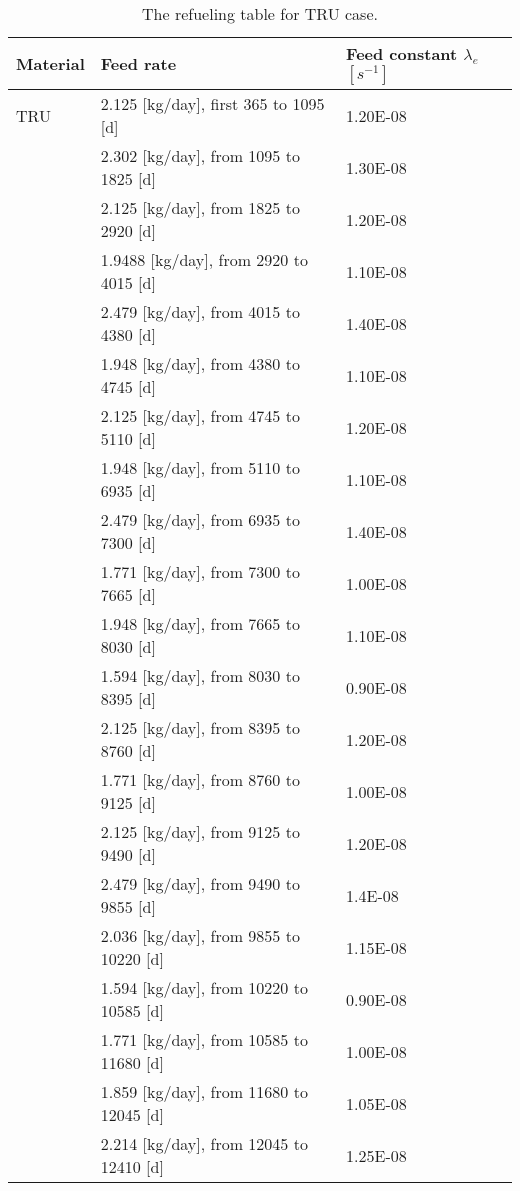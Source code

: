 \newpage
\begin{longtable}{|p{}|p{}|p{}|}
	\caption{The refueling table for TRU case.} 
	\vspace{-0.2in}
	\label{tab:table10}
	\endfirsthead
	\endhead
	\hline
	\textbf{Material} & \textbf{Feed rate} & \textbf{Feed 
		constant} $\lambda_{e}$ $[s^{-1}]$ \\
	\hline
	TRU        &  2.125 [kg/day], first 365 to 1095  [d] & 1.20E-08 \\
	&  2.302  [kg/day], from 1095 to 1825 [d] & 		1.30E-08 \\
	&  2.125  [kg/day], from 1825 to 2920 [d] & 		1.20E-08 \\
	&  1.9488 [kg/day], from 2920 to 4015 [d]& 		1.10E-08	\\
	&  2.479 [kg/day], from 4015 to 4380 [d] &		1.40E-08	\\
	&  1.948 [kg/day], from 4380 to 4745 [d] &		1.10E-08	\\
	&  2.125   [kg/day], from 4745 to 5110 [d] &	1.20E-08	\\
	&  1.948   [kg/day], from 5110 to 6935 [d]&		1.10E-08		\\
	&  2.479  [kg/day], from 6935 to 7300 [d]&		1.40E-08	 \\ 
	&  1.771   [kg/day], from 7300 to 7665 [d]&		1.00E-08	 \\ 
	&  1.948   [kg/day], from 7665 to 8030 [d]&		1.10E-08	 \\ 
	&  1.594   [kg/day], from 8030 to 8395 [d]&		0.90E-08	 \\
	&  2.125   [kg/day], from 8395 to 8760 [d]&		1.20E-08	 \\
	&  1.771  [kg/day], from 8760 to 9125 [d]&		1.00E-08	 \\
	& 2.125  [kg/day], from 9125 to 9490 [d]&		1.20E-08	 \\
	&  2.479  [kg/day], from 9490 to 9855 [d]&		1.4E-08	 \\
	&   2.036 [kg/day], from 9855 to 10220 [d]&		1.15E-08	 \\
	&  1.594 [kg/day], from 10220 to 10585 [d]&		0.90E-08	 \\
	&   1.771  [kg/day], from 10585 to 11680 [d]&		1.00E-08	 \\
	&  1.859   [kg/day], from 11680 to 12045 [d]&		1.05E-08	 \\
	& 2.214    [kg/day], from 12045 to 12410 [d]&		1.25E-08	 \\

\end{longtable}
